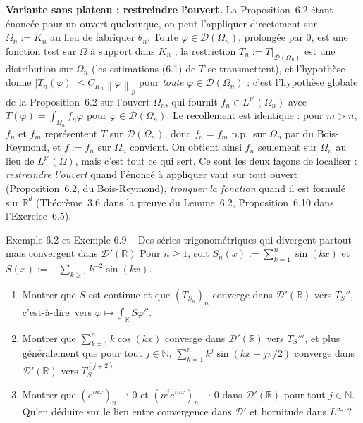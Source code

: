 \documentclass[11pt,a4paper]{article}
\newcommand{\R}{\mathbb{R}}
\newcommand{\N}{\mathbb{N}}
\newcommand{\interieur}[1]{\mathring{#1}}
\newcommand{\norm}[1]{\left\|#1\right\|}
\newcommand{\ie}{c'est-à-dire}
\newcommand{\D}{\mathcal{D}}
\theoremstyle{definition}
\begin{document}
\begin{commentaire}
\textbf{Variante sans plateau : restreindre l'ouvert.} La Proposition~6.2 étant énoncée pour un ouvert quelconque, on peut l'appliquer directement sur $\Omega_n:=\interieur K_n$ au lieu de fabriquer $\theta_n$. Toute $\varphi\in\D(\Omega_n)$, prolongée par $0$, est une fonction test sur $\Omega$ à support dans $K_n$ ; la restriction $T_n:=T|_{\D(\Omega_n)}$ est une distribution sur $\Omega_n$ (les estimations (6.1) de $T$ se transmettent), et l'hypothèse donne $|T_n(\varphi)|\le C_{K_n}\norm\varphi_p$ pour \emph{toute} $\varphi\in\D(\Omega_n)$ : c'est l'hypothèse globale de la Proposition~6.2 sur l'ouvert $\Omega_n$, qui fournit $f_n\in L^{p'}(\Omega_n)$ avec $T(\varphi)=\int_{\Omega_n}f_n\varphi$ pour $\varphi\in\D(\Omega_n)$. Le recollement est identique : pour $m>n$, $f_n$ et $f_m$ représentent $T$ sur $\D(\Omega_n)$, donc $f_n=f_m$ p.p.\ sur $\Omega_n$ par du Bois-Reymond, et $f:=f_n$ sur $\Omega_n$ convient. On obtient ainsi $f_n$ seulement sur $\Omega_n$ au lieu de $L^{p'}(\Omega)$, mais c'est tout ce qui sert. Ce sont les deux façons de localiser : \emph{restreindre l'ouvert} quand l'énoncé à appliquer vaut sur tout ouvert (Proposition~6.2, du Bois-Reymond), \emph{tronquer la fonction} quand il est formulé sur $\R^d$ (Théorème~3.6 dans la preuve du Lemme~6.2, Proposition~6.10 dans l'Exercice~6.5).
\end{commentaire}

\begin{exo}{Exemple 6.2 et Exemple 6.9 -- Des séries trigonométriques qui divergent partout mais convergent dans $\D'(\R)$}
Pour $n\ge1$, soit $S_n(x):=\sum_{k=1}^n\sin(kx)$ et $S(x):=-\sum_{k\ge1}k^{-2}\sin(kx)$.
\begin{enumerate}[label=(\alph*)]
  \item Montrer que $S$ est continue et que $(T_{S_n})_n$ converge dans $\D'(\R)$ vers $T_S''$, \ie\ vers $\varphi\mapsto\int_\R S\varphi''$.
  \item Montrer que $\sum_{k=1}^nk\cos(kx)$ converge dans $\D'(\R)$ vers $T_S'''$, et plus généralement que pour tout $j\in\N$, $\sum_{k=1}^nk^j\sin(kx+j\pi/2)$ converge dans $\D'(\R)$ vers $T_S^{(j+2)}$.
  \item Montrer que $(e^{inx})_{n}\rightharpoonup0$ et $(n^je^{inx})_n\rightharpoonup0$ dans $\D'(\R)$ pour tout $j\in\N$. Qu'en déduire sur le lien entre convergence dans $\D'$ et bornitude dans $L^\infty$ ?
\end{enumerate}
\end{exo}
\end{document}
